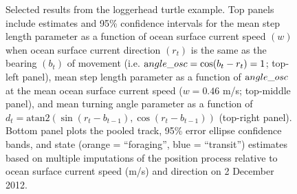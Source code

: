 \documentclass[12pt]{article}
\begin{document}
\begin{figure}[htbp]
  \caption{Selected results from the loggerhead turtle example. Top panels include estimates and 95\% confidence intervals for the mean step length parameter as a function of ocean surface current speed $(w)$ when ocean surface current direction $(r_t)$ is the same as the bearing $(b_t)$ of movement (i.e. ${\text angle\_osc}=\cos(b_t-r_t)=1$; top-left panel), mean step length parameter as a function of ${\text angle\_osc}$ at the mean ocean surface current speed ($w=0.46$ m/s; top-middle panel), and mean turning angle parameter as a function of $d_t=\text{atan2}(\sin(r_t-b_{t-1}),\cos(r_t-b_{t-1}))$ (top-right panel). Bottom panel plots the pooled track, 95\% error ellipse confidence bands, and state (orange = ``foraging'', blue = ``transit'') estimates based on multiple imputations of the position process relative to ocean surface current speed (m/s) and direction on 2 December 2012.}
  \label{fig:turtleResults}
\end{figure}
\end{document}
